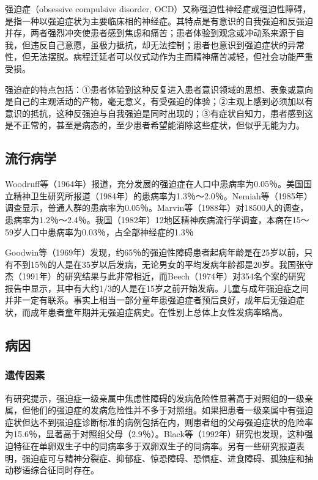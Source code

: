 强迫症（obsessive compulsive disorder,
OCD）又称强迫性神经症或强迫性障碍，是指一种以强迫症状为主要临床相的神经症。其特点是有意识的自我强迫和反强迫并存，两者强烈冲突使患者感到焦虑和痛苦；患者体验到观念或冲动系来源于自我，但违反自己意愿，虽极力抵抗，却无法控制；患者也意识到强迫症状的异常性，但无法摆脱。病程迁延者可以仪式动作为主而精神痛苦减轻，但社会功能严重受损。

强迫症的特点包括：①患者体验到这种反复进入患者意识领域的思想、表象或意向是自己的主观活动的产物，毫无意义，有受强迫的体验；②主观上感到必须加以有意识的抵抗，这种反强迫与自我强迫是同时出现的；③有症状自知力，患者感到这是不正常的，甚至是病态的，至少患者希望能消除这些症状，但似乎无能为力。

\subsection{流行病学}

Woodruff等（1964年）报道，充分发展的强迫症在人口中患病率为0.05％。美国国立精神卫生研究所报道（1984年）的患病率为1.3％～2.0％。Nemiah等（1985年）调查显示，普通人群的患病率为0.05％。Marvin等（1988年）对18500人的调查，患病率为1.2％～2.4％。我国（1982年）12地区精神疾病流行学调查，本病在15～59岁人口中患病率为0.03％，占全部神经症的1.3％

Goodwin等（1969年）发现，约65％的强迫性障碍患者起病年龄是在25岁以前，只有不到15％的人是在35岁以后发病，无论男女的平均发病年龄都是20岁。我国张守杰（1991年）的研究结果与此非常相近，而Beech（1974年）对354名个案的研究报告中显示，其中有大约1/3的人是在15岁之前开始发病。儿童与成年强迫症之间并非一定有联系。事实上相当一部分童年患强迫症者预后良好，成年后无强迫症状，而成年患者童年期并无强迫症病史。在性别上总体上女性发病率略高。

\subsection{病因}

\subsubsection{遗传因素}

有研究提示，强迫症一级亲属中焦虑性障碍的发病危险性显著高于对照组的一级亲属，但他们的强迫症的发病危险性并不多于对照组。如果把患者一级亲属中有强迫症状但达不到强迫症诊断标准的病例包括在内，则患者组的父母强迫症状的危险率为15.6％，显著高于对照组父母（2.9％）。Black等（1992年）研究也发现，这种强迫特征在单卵双生子中的同病率多于双卵双生子的同病率。另有一些研究报道表明，强迫症可与精神分裂症、抑郁症、惊恐障碍、恐惧症、进食障碍、孤独症和抽动秽语综合征同时存在。

